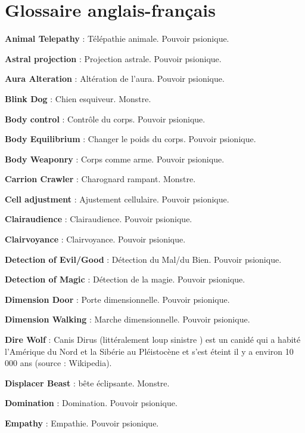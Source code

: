 \documentclass[11pt]{article}
\begin{document}
{\bigskip

\newpage
{}\section*{Glossaire anglais-français}

{\parindent0cm

\textbf{Animal Telepathy} : Télépathie animale. Pouvoir psionique.

\textbf{Astral projection} : Projection astrale. Pouvoir psionique.

\textbf{Aura Alteration} : Altération de l'aura. Pouvoir psionique.

\textbf{Blink Dog} : Chien esquiveur. Monstre.

\textbf{Body control} : Contrôle du corps. Pouvoir psionique.

\textbf{Body Equilibrium} : Changer le poids du corps. Pouvoir psionique.

\textbf{Body Weaponry} : Corps comme arme. Pouvoir psionique.

\textbf{Carrion Crawler} : Charognard rampant. Monstre.

\textbf{Cell adjustment} : Ajustement cellulaire. Pouvoir psionique.

\textbf{Clairaudience} : Clairaudience. Pouvoir psionique.

\textbf{Clairvoyance} : Clairvoyance. Pouvoir psionique.

\textbf{Detection of Evil/Good} : Détection du Mal/du Bien. Pouvoir psionique.

\textbf{Detection of Magic} : Détection de la magie. Pouvoir psionique.

\textbf{Dimension Door} : Porte dimensionnelle. Pouvoir psionique.

\textbf{Dimension Walking} : Marche dimensionnelle. Pouvoir psionique.

\textbf{Dire Wolf} : Canis Dirus (littéralement \og loup sinistre \fg) est un canidé qui a habité l'Amérique du Nord et la Sibérie au Pléistocène et s’est éteint il y a environ 10 000 ans (source : Wikipedia).

\textbf{Displacer Beast} : bête éclipsante. Monstre.

\textbf{Domination} : Domination. Pouvoir psionique.

\textbf{Empathy} : Empathie. Pouvoir psionique.

}}
\end{document}

